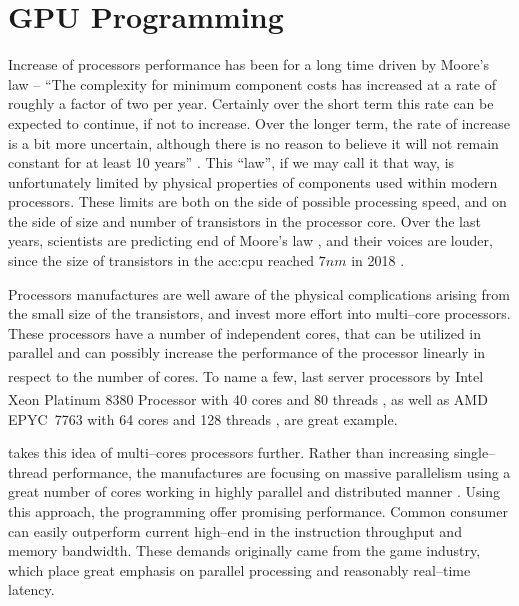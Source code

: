 \chapter{GPU Programming}

Increase of processors performance has been for a long time driven by Moore's law -- \enquote{The complexity for minimum component costs has increased at a rate of roughly a factor of two per year. Certainly over the short term this rate can be expected to continue, if not to increase. Over the longer term, the rate of increase is a bit more uncertain, although there is no reason to believe it will not remain constant for at least 10 years} \citep{MooresLaw}. This \enquote{law}, if we may call it that way, is unfortunately limited by physical properties of components used within modern processors. These limits are both on the side of possible processing speed, and on the side of size and number of transistors in the processor core. Over the last years, scientists are predicting end of Moore's law \citep{MooresLawEnd}, and their voices are louder, since the size of transistors in the \acrfull{acc:cpu} reached $7nm$ in 2018 \citep{SamsungSevenNm}. 

Processors manufactures are well aware of the physical complications arising from the small size of the transistors, and invest more effort into multi--core processors. These processors have a number of independent cores, that can be utilized in parallel and can possibly increase the performance of the processor linearly in respect to the number of cores. To name a few, last server processors by Intel\textsuperscript{\textregistered} Xeon\textsuperscript{\textregistered} Platinum 8380 Processor with 40 cores and 80 threads \citep{IntelXeonPlatinum}, as well as AMD EPYC\texttrademark\ 7763 with 64 cores and 128 threads \citep{AMDEpyc}, are great example.

 takes this idea of multi--cores processors further. Rather than increasing single--thread performance, the \gpu manufactures are focusing on massive parallelism using a great number of cores working in highly parallel and distributed manner \citep{GPUComputingOwens}. Using this approach, the \gpu programming offer promising performance. Common consumer  can easily outperform current high--end  in the instruction throughput and memory bandwidth. These demands originally came from the game industry, which place great emphasis on parallel processing and reasonably real--time latency. 


